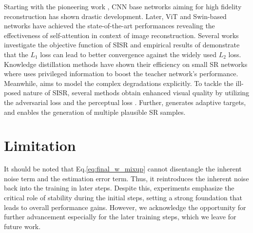 \documentclass[letterpaper]{article} %
\begin{document}
Starting with the pioneering work \cite{SISR1_SRCNN}, CNN base networks \cite{SISR5_SAN, SISR12_HAN, SISR2_EDSR, SISR3_VDSR, SISR4_RCAN, SISR11_CRAN} aiming for high fidelity reconstruction has shown drastic development.
%
Later, ViT and Swin-based networks \cite{chen2021pre_transformer1, liang2021swinir, zhang2022swinfir, chen2023hat} have achieved the state-of-the-art performances revealing the effectiveness of self-attention in context of image reconstruction.
%
Several works investigate the objective function of SISR \cite{he2022revisiting_illposed_2, ning2021uncertainty} and empirical results of \cite{SISR2_EDSR} demonstrate that the $L_1$ loss can lead to better convergence against the widely used $L_2$ loss.
%
Knowledge distillation methods \cite{zhang2021data_distillation1, wang2021towards_distillation2, lee2020learning_distillation3, gao2019image_distillation4} have shown their efficiency on small SR networks where \cite{lee2020learning_distillation3} uses privileged information to boost the teacher network's performance.
%
Meanwhile, \cite{lew2021pixel, ikc, kernelgan} aims to model the complex degradations explicitly. 
%
%
%
To tackle the ill-posed nature of SISR, several methods \cite{SISR6_SRGAN, SISR7_ESRGAN, SISR8_RankSRGAN} obtain enhanced visual quality by utilizing the adversarial loss and the perceptual loss \cite{perceptual_loss_vgg}. Further, \cite{jo2021tackling_illposed_1} generates adaptive targets, and \cite{hyun2020varsr, SISR9_SRFlow} enables the generation of multiple plausible SR samples.
%


%
%
%
%
%
%



\section{Limitation}
It should be noted that Eq.\eqref{eq:final_w_mixup} cannot disentangle the inherent noise term and the estimation error term. Thus, it reintroduces the inherent noise back into the training in later steps. Despite this, experiments emphasize the critical role of stability during the initial steps, setting a strong foundation that leads to overall performance gains. However, we acknowledge the opportunity for further advancement especially for the later training steps, which we leave for future work.
\end{document}
